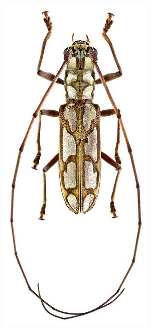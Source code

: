 \documentclass[letterpaper, 11pt]{article}
\begin{document}
\begin{figure}[ht!]
  \centering
\begin{subfigure}[ht!]{0.24\textwidth}
    \includegraphics[width=\textwidth]{Cerambycid1}

\end{subfigure}
\end{figure}
\end{document}

